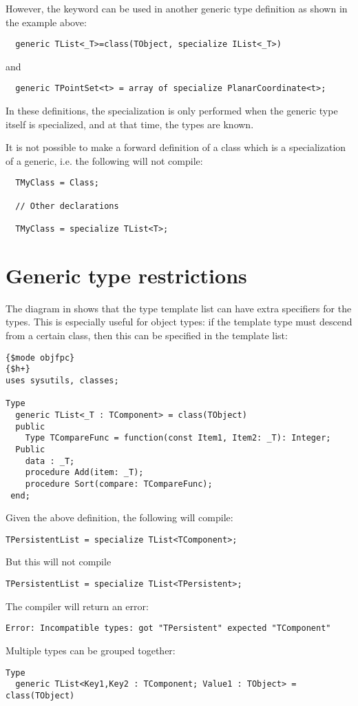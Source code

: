 However, the  keyword can be used in another generic type definition as shown in the example above:
\begin{verbatim}
  generic TList<_T>=class(TObject, specialize IList<_T>)
\end{verbatim}
and
\begin{verbatim}
  generic TPointSet<t> = array of specialize PlanarCoordinate<t>;
\end{verbatim}
In these definitions, the specialization is only performed when the generic type itself is specialized,
and at that time, the types are known.

\begin{remark}
It is not possible to make a forward definition of a class which is a specialization
of a generic, i.e. the following will not compile:
\begin{verbatim}
  TMyClass = Class;

  // Other declarations

  TMyClass = specialize TList<T>;
\end{verbatim}
\end{remark}


\section{Generic type restrictions}
The diagram in  shows that the type template list can have extra specifiers for the types.
This is especially useful for object types: if the template type must descend from a certain class, then this can be
specified in the template list:
\begin{verbatim}
{$mode objfpc}
{$h+}
uses sysutils, classes;

Type
  generic TList<_T : TComponent> = class(TObject)
  public
    Type TCompareFunc = function(const Item1, Item2: _T): Integer;
  Public
    data : _T;
    procedure Add(item: _T);
    procedure Sort(compare: TCompareFunc);
 end;
\end{verbatim}
Given the above definition, the following will compile:
\begin{verbatim}
TPersistentList = specialize TList<TComponent>;
\end{verbatim}
But this will not compile
\begin{verbatim}
TPersistentList = specialize TList<TPersistent>;
\end{verbatim}
The compiler will return an error:
\begin{verbatim}
Error: Incompatible types: got "TPersistent" expected "TComponent"
\end{verbatim}
Multiple types can be grouped together:
\begin{verbatim}
Type
  generic TList<Key1,Key2 : TComponent; Value1 : TObject> = class(TObject)
\end{verbatim}

